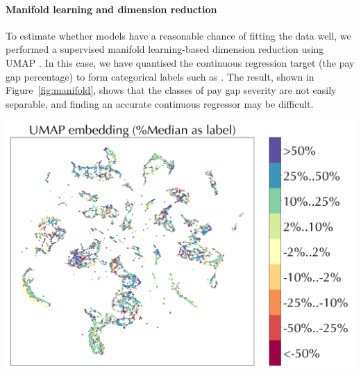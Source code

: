 \paragraph{Manifold learning and dimension reduction} To estimate whether models have a reasonable chance of fitting the data well, we performed a supervised manifold learning-based dimension reduction using UMAP \cite{mcinnes2018umap}. In this case, we have quantised the continuous regression target (the pay gap percentage) to form categorical labels such as . The result, shown in Figure\ \ref{fig:manifold}, shows that the classes of pay gap severity are not easily separable, and finding an accurate continuous regressor may be difficult. 

\begin{centering}
    \includegraphics[width=0.99\linewidth]{images/umap-median.png}
    \label{fig:manifold}
\end{centering}

